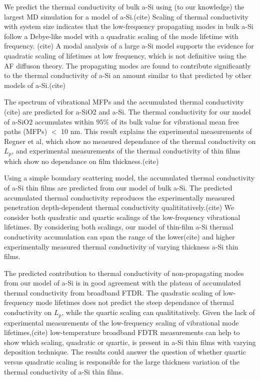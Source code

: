 \documentclass[aps,prb,twocolumn,superscriptaddress,footinbib,amsmath,amssymb,floatfix]{revtex4}
\begin{document}
We predict the thermal conductivity of bulk a-Si using (to our 
knowledge) the largest MD simulation for a model of a-Si.(cite) 
Scaling 
of thermal conductivity with system size indicates that the 
low-frequency propagating modes in bulk a-Si follow a Debye-like model 
with a quadratic scaling of the mode lifetime with frequency.
(cite) 
A modal analysis of a large a-Si model supports the evidence 
for quadratic scaling of lifetimes at low frequency,  
which is not definitive using the AF diffuson theory.
\cite{feldman_thermal_1993,feldman_numerical_1999} The propagating 
modes are found to contribute significantly to the thermal 
conductivity of a-Si an amount similar to that predicted by 
other models of a-Si.(cite)

The spectrum of vibrational MFPs and the accumulated thermal conductivity
(cite) 
are predicted for a-SiO2 and a-Si. The thermal conductivity for our model 
of a-SiO2 accumulates within $95\%$ of its bulk value for vibrational 
mean free paths (MFPs) $<$ 10 nm. 
This result explains the experimental measurements 
of Regner et al, which show no measured dependance of the thermal 
conductivity on $L_p$,\cite{regner_broadband_2013} and experimental 
measurements of the thermal conductivity of thin films which 
show no dependance on film thickness.(cite) 

Using a simple boundary scattering model, the accumulated thermal 
conductivity of a-Si thin films are predicted from our model 
of bulk a-Si. The predicted accumulated thermal conductivity 
reproduces the experimentally measured penetration depth-dependent 
thermal conductivity qualititatively.(cite) We consider both 
quadratic and quartic 
scalings of the low-frequency 
vibrational lifetimes. 
By considering both scalings, our model of thin-film a-Si thermal 
conductivity accumulation can span the range of the 
lower(cite) and 
higher\cite{liu_high_2009,yang_anomalously_2010} 
experimentally measured thermal conductivity of varying thickness 
a-Si thin films. 

The predicted contribution to thermal conductivity of 
non-propagating modes from our model of a-Si is in good agreement 
with the plateau of accumulated thermal conductivity from broadband 
FTDR. The quadratic scaling of low-frequency mode lifetimes 
does not predict the steep dependance of thermal conductivity on
$L_p$, while the quartic scaling can qualititatively. Given the 
lack of experimental measurements of the low-frequency scaling of 
vibrational mode lifetimes,(cite) low-temperature broadband FDTR 
measurements can help to show which scaling, quadratic or 
quartic, is present in a-Si thin films with varying deposition 
technique. The results could answer the question of whether 
quartic versus quadratic scaling is responsible for the large 
thickness variation of the thermal conductivity of a-Si thin films. 
\end{document}
